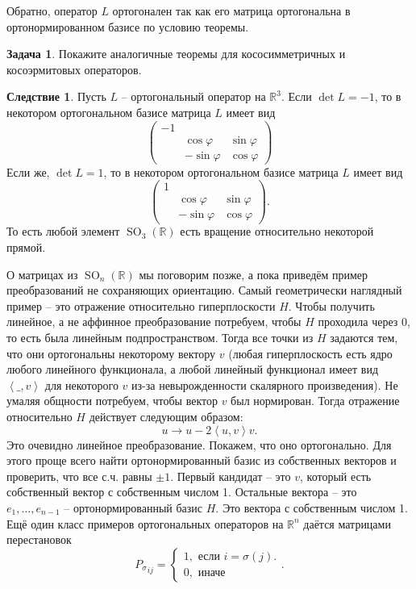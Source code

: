 \documentclass[10pt,a4paper,oneside]{book}
\theoremstyle{definition}
\newtheorem{zad}{Задача}
\newtheorem{cor}{Следствие}
\newcommand{\mb}[1]{\mathbb{#1}}
\newcommand{\SO}{\operatorname{SO}}
\def\lan{\left\langle }
\def\ran{\right\rangle}
\def\zd{\begin{zad}}
\def\ezd{\end{zad}}
\def\crl{\begin{cor}}
\def\ecrl{\end{cor}}
\begin{document}
Обратно, оператор $L$ ортогонален так как его матрица ортогональна в ортонормированном базисе по условию теоремы. 
\endproof




\zd Покажите аналогичные теоремы для кососимметричных и косоэрмитовых операторов.
\ezd

\crl Пусть $L$ -- ортогональный оператор на $\mb R^3$. Если $\det L=-1$, то в некотором ортогональном базисе матрица $L$ имеет вид 
$$\begin{pmatrix}
- 1 &&\\
&\cos \varphi & \sin \varphi\\
&-\sin \varphi &\cos \varphi
\end{pmatrix}$$
Если же, $\det L=1$, то в некотором ортогональном базисе матрица $L$ имеет вид 
$$\begin{pmatrix}
1 &&\\
&\cos \varphi & \sin \varphi\\
&-\sin \varphi &\cos \varphi
\end{pmatrix}.$$
То есть любой элемент $\SO_3(\mb R)$ есть вращение относительно некоторой прямой. 
\ecrl

О матрицах из $\SO_n(\mb R)$ мы поговорим позже, а пока приведём пример преобразований не сохраняющих ориентацию. Самый геометрически наглядный пример -- это отражение относительно гиперплоскости $H$. Чтобы получить линейное, а не аффинное преобразование потребуем, чтобы $H$ проходила через 0, то есть была линейным подпространством. Тогда все точки из $H$ задаются тем, что они ортогональны некоторому вектору $v$ (любая гиперплоскость есть ядро любого линейного функционала, а любой линейный функционал имеет вид $\lan \_ ,v \ran$ для некоторого $v$ из-за невырожденности скалярного произведения). Не умаляя общности потребуем, чтобы вектор $v$ был нормирован. Тогда отражение относительно $H$ действует следующим образом:
$$u \to u - 2 \lan u,v\ran v.$$
Это очевидно линейное преобразование. Покажем, что оно ортогонально. Для этого проще всего найти ортонормированный базис из собственных векторов и проверить, что все с.ч. равны $\pm 1$. Первый кандидат -- это $v$, который есть собственный вектор с собственным числом 1. Остальные вектора -- это $e_1,\dots, e_{n-1}$ -- ортонормированный базис $H$. Это вектора с собственным числом 1. \\

Ещё один класс примеров ортогональных операторов на $\mb R^n$ даётся матрицами перестановок $${P_{\sigma}}_{ij}=\begin{cases} 1, \text{ если $i=\sigma(j)$}.\\
0, \text{ иначе}
\end{cases}. $$  
\end{document}
